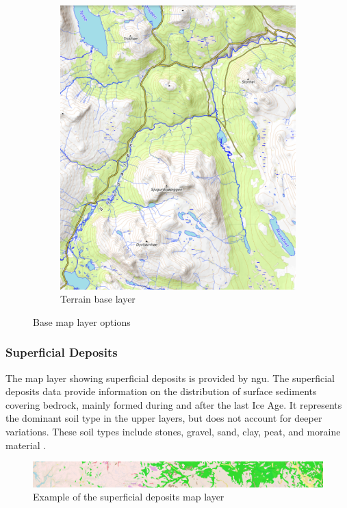 \begin{figure}[h]
\begin{subfigure}[b]{0.45\textwidth}
         \includegraphics[width=\textwidth]{figures/base_layer_topo.pdf}
         \caption{Terrain base layer}
         \label{fig:base_layer_topo}
     \end{subfigure}
    \caption{Base map layer options}
    \label{fig:base_layers}
\end{figure}

\subsubsection*{Superficial Deposits}
The map layer showing superficial deposits is provided by \acrshort{ngu}. The superficial deposits data provide information on the distribution of surface sediments covering bedrock, mainly formed during and after the last Ice Age. It represents the dominant soil type in the upper layers, but does not account for deeper variations. These soil types include stones, gravel, sand, clay, peat, and moraine material \cite{geonorge_losmasser}. 

\begin{figure}[h]
    \centering
    \includegraphics[width=1\linewidth]{figures/losmasse_eksempel.pdf}
    \caption{Example of the superficial deposits map layer}
    \label{fig:superficial_deposit_example}
\end{figure}

